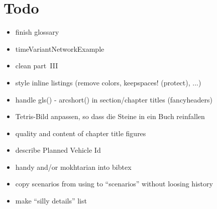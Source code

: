 \section*{Todo}

\begin{itemize}\styleItemize

\item finish glossary

\item timeVariantNetworkExample

\item clean part~III

\item style inline listings (remove colors, keepspaces! (protect), ...)

\item handle gls() - arcshort() in section/chapter titles (fancyheaders)

\item Tetris-Bild anpassen, so dass die Steine in ein Buch reinfallen

\item quality and content of chapter title figures

\item describe Planned Vehicle Id

\item handy and/or mokhtarian into bibtex

\item copy scenarios from using to ``scenarios'' without loosing history

\item make ``silly details'' list








\end{itemize}